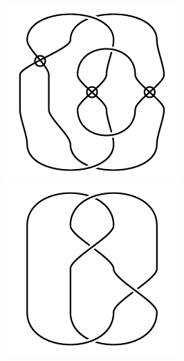 \begin{figure}[H]
\begin{minipage}[b]{.18\linewidth}
\centering
\includegraphics[width=\linewidth]{../data/virtual_4_107.png}
\end{minipage}
\begin{minipage}[b]{.18\linewidth}
\centering
\includegraphics[width=\linewidth]{../data/virtual_4_108.png}
\end{minipage}
\end{figure}

